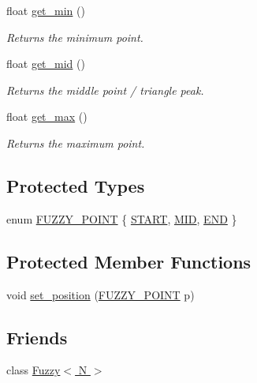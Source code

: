 \begin{DoxyCompactItemize}
float \hyperlink{classetk_1_1_fuzzy_1_1_set_a2a31cd40458aa086bdb21f1d4fd5768a}{get\-\_\-min} ()
\begin{DoxyCompactList}\small\item\em Returns the minimum point. \end{DoxyCompactList}\item 
float \hyperlink{classetk_1_1_fuzzy_1_1_set_aace726f2405de59678bfaf1124e41def}{get\-\_\-mid} ()
\begin{DoxyCompactList}\small\item\em Returns the middle point / triangle peak. \end{DoxyCompactList}\item 
float \hyperlink{classetk_1_1_fuzzy_1_1_set_ade3e255cd25f7b2944fbd8ee3c28434d}{get\-\_\-max} ()
\begin{DoxyCompactList}\small\item\em Returns the maximum point. \end{DoxyCompactList}\end{DoxyCompactItemize}
\subsection*{Protected Types}
\begin{DoxyCompactItemize}
\item 
enum \hyperlink{classetk_1_1_fuzzy_1_1_set_a458bba0e19aa05ab891962a705243a97}{F\-U\-Z\-Z\-Y\-\_\-\-P\-O\-I\-N\-T} \{ \hyperlink{classetk_1_1_fuzzy_1_1_set_a458bba0e19aa05ab891962a705243a97ac8fc7790d2c5d6719b755e21658d60f5}{S\-T\-A\-R\-T}, 
\hyperlink{classetk_1_1_fuzzy_1_1_set_a458bba0e19aa05ab891962a705243a97a622f9b497afa3b59681c1875936788ee}{M\-I\-D}, 
\hyperlink{classetk_1_1_fuzzy_1_1_set_a458bba0e19aa05ab891962a705243a97a58517baf34b39d08da1c1a184d872856}{E\-N\-D}
 \}
\end{DoxyCompactItemize}
\subsection*{Protected Member Functions}
\begin{DoxyCompactItemize}
\item 
void \hyperlink{classetk_1_1_fuzzy_1_1_set_ac02bbfc5d8a4388cdedc2a172cab9209}{set\-\_\-position} (\hyperlink{classetk_1_1_fuzzy_1_1_set_a458bba0e19aa05ab891962a705243a97}{F\-U\-Z\-Z\-Y\-\_\-\-P\-O\-I\-N\-T} p)
\end{DoxyCompactItemize}
\subsection*{Friends}
\begin{DoxyCompactItemize}
\item 
class \hyperlink{classetk_1_1_fuzzy_1_1_set_adea15307855814ee46c7bb9177a6bac2}{Fuzzy$<$ N $>$}
\end{DoxyCompactItemize}


